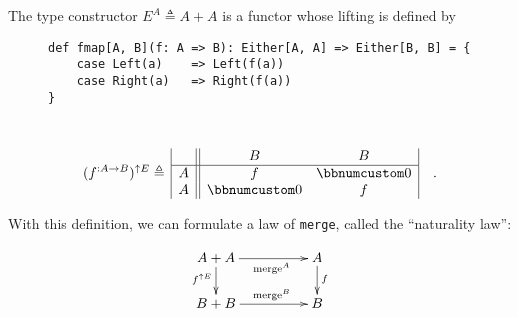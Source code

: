 The type constructor $E^{A}\triangleq A+A$ is a functor whose lifting
is defined by

\begin{wrapfigure}{L}{0.6\columnwidth}%
\vspace{-0.8\baselineskip}
\begin{lstlisting}
def fmap[A, B](f: A => B): Either[A, A] => Either[B, B] = {
    case Left(a)    => Left(f(a))
    case Right(a)   => Right(f(a))
}
\end{lstlisting}

\vspace{-1.65\baselineskip}
\end{wrapfigure}%

~\vspace{-1.45\baselineskip}
\[
(f^{:A\rightarrow B})^{\uparrow E}\triangleq\,\begin{array}{|c||cc|}
 & B & B\\
\hline A & f & \bbnum 0\\
A & \bbnum 0 & f
\end{array}\quad.
\]
\vspace{-0.7\baselineskip}

With this definition, we can formulate a law of \lstinline!merge!,
called the \textsf{``}naturality law\textsf{''}:

\begin{wrapfigure}{L}{0.3\columnwidth}%
\vspace{-2\baselineskip}
\[
\xymatrix{\xyScaleY{1.6pc}\xyScaleX{4.0pc}A+A\ar[d]\sb(0.45){f^{\uparrow E}}\ar[r]\sb(0.55){\text{merge}^{A}} & A\ar[d]\sp(0.45){f}\\
B+B\ar[r]\sp(0.55){\text{merge}^{B}} & B
}
\]
\vspace{-0.1\baselineskip}
\end{wrapfigure}%

